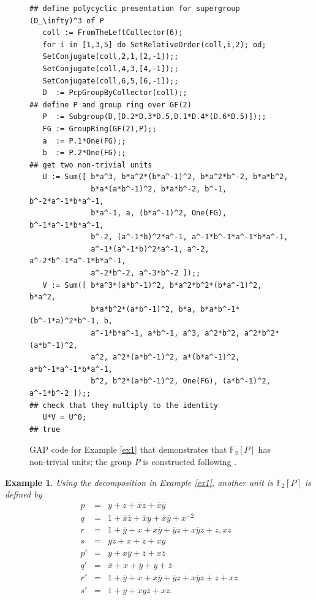 \documentclass[11pt]{amsart}
\theoremstyle{mythm}
\theoremstyle{mydef}
\newtheorem{example}[theorem]{Example}
\theoremstyle{myrem}
\numberwithin{equation}{section}
\newcommand{\ol}{\overline}
\begin{document}
\begin{figure}[h]
\begin{verbatim}
## define polycyclic presentation for supergroup (D_\infty)^3 of P
   coll := FromTheLeftCollector(6);
   for i in [1,3,5] do SetRelativeOrder(coll,i,2); od;     
   SetConjugate(coll,2,1,[2,-1]);; 
   SetConjugate(coll,4,3,[4,-1]);;   
   SetConjugate(coll,6,5,[6,-1]);;
   D  := PcpGroupByCollector(coll);; 
## define P and group ring over GF(2)
   P  := Subgroup(D,[D.2*D.3*D.5,D.1*D.4*(D.6*D.5)]);;
   FG := GroupRing(GF(2),P);;        
   a  := P.1*One(FG);;               
   b  := P.2*One(FG);;
## get two non-trivial units
   U := Sum([ b*a^3, b*a^2*(b*a^-1)^2, b*a^2*b^-2, b*a*b^2,
              b*a*(a*b^-1)^2, b*a*b^-2, b^-1, b^-2*a^-1*b*a^-1,
              b*a^-1, a, (b*a^-1)^2, One(FG), b^-1*a^-1*b*a^-1,  
              b^-2, (a^-1*b)^2*a^-1, a^-1*b^-1*a^-1*b*a^-1,
              a^-1*(a^-1*b)^2*a^-1, a^-2, a^-2*b^-1*a^-1*b*a^-1,
              a^-2*b^-2, a^-3*b^-2 ]);;
   V := Sum([ b*a^3*(a*b^-1)^2, b*a^2*b^2*(b*a^-1)^2, b*a^2,
              b*a*b^2*(a*b^-1)^2, b*a, b*a*b^-1*(b^-1*a)^2*b^-1, b,
              a^-1*b*a^-1, a*b^-1, a^3, a^2*b^2, a^2*b^2*(a*b^-1)^2,
              a^2, a^2*(a*b^-1)^2, a*(b*a^-1)^2, a*b^-1*a^-1*b*a^-1, 
              b^2, b^2*(a*b^-1)^2, One(FG), (a*b^-1)^2, a^-1*b^-2 ]);;
## check that they multiply to the identity
   U*V = U^0;
## true
\end{verbatim}
\caption{GAP code for Example \ref{ex1} that demonstrates that $\mathbb{F}_2[P]$ has non-trivial units; the group $P$ is constructed following  \cite{P}.}\label{fig_P}
\end{figure}



\begin{example}Using the decomposition in Example \ref{ex1}, another   unit is $\mathbb{F}_2[P]$ is defined by  
\begin{eqnarray*}
p &=& y+ z+\ol xz+\ol x\ol y  \\
q &=&  1+\ol x\ol z+\ol xy+\ol x\ol y+ x^{-2}  \\
r &=&1+\ol y+ x+ x\ol y+\ol yz+ x\ol yz+ z, xz \\
s &=&   y\ol z+\ol x+\ol z+ xy\\[1ex]
p' &=& y+x\ol y+\ol z+ x\ol z  \\
q' &=&\ol x+ x+\ol y+ y+\ol z \\
r' &=&  1+\ol y+ x+ x\ol y+\ol yz+ x\ol yz+ z+ xz \\ 
s' &=&  1+ y+\ol xy\ol z+ x\ol z.
\end{eqnarray*}
\end{example}
\end{document}
